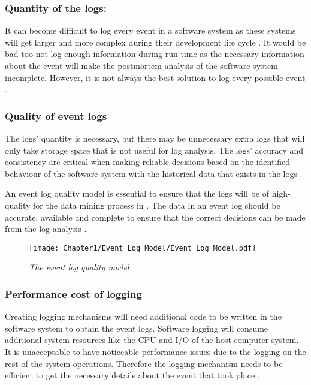 \subsubsection{Quantity of the logs:} 
It can become difficult to log every event in a software system as these systems will get larger and more complex during their development life cycle \cite{Stojanov2017}. It would be bad too not log enough information during run-time as the necessary information about the event will make the postmortem analysis of the software system incomplete. However, it is not always the best solution to log every possible event \cite{Zhu2015, Jans2012}.

\subsubsection{Quality of event logs} 
The logs' quantity is necessary, but there may be unnecessary extra logs that will only take storage space that is not useful for log analysis. The logs' accuracy and consistency are critical when making reliable decisions based on the identified behaviour of the software system with the historical data that exists in the logs \cite{Stojanov2017,Kherbouche2017}.\par An event log quality model is essential to ensure that the logs will be of high-quality for the data mining process in . The data in an event log should be accurate, available and complete to ensure that the correct decisions can be made from the log analysis \cite{Kherbouche2017, VanDerAalst2011}.

\begin{figure}[!htb] %
	\centering %
	\texttt{[image: Chapter1/Event\_Log\_Model/Event\_Log\_Model.pdf]}
	\caption[The event log quality model]
	{\textit{The event log quality model \cite{Kherbouche2017}}} \label{fig:EventQModel}
\end{figure}

\subsubsection{Performance cost of logging} 
Creating logging mechanisms will need additional code to be written in the software system to obtain the event logs. Software logging will consume additional system resources like the CPU and I/O of the host computer system. It is unacceptable to have noticeable performance issues due to the logging on the rest of the system operations. Therefore the logging mechanism needs to be efficient to get the necessary details about the event that took place \cite{Zhu2015,Zhu2019}. 

